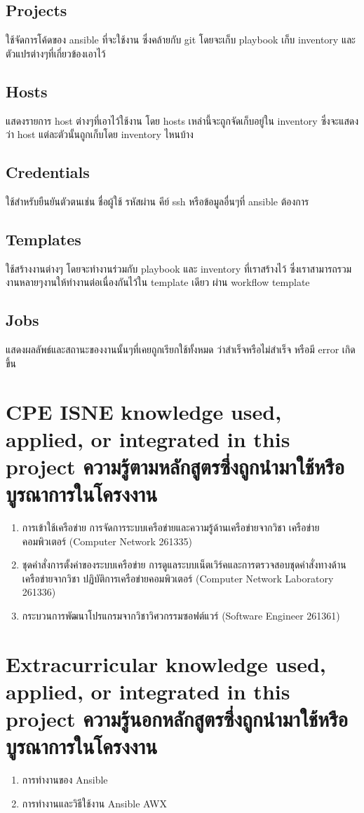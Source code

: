 \subsection{Projects}
\hspace{0.5in} ใช้จัดการโค้ดของ ansible ที่จะใช้งาน ซึ่งคล้ายกับ git โดยจะเก็บ playbook เก็บ inventory และตัวแปรต่างๆที่เกี่ยวข้องเอาไว้

\subsection{Hosts}
\hspace{0.5in} แสดงรายการ host ต่างๆที่เอาไว้ใช้งาน โดย hosts เหล่านี้จะถูกจัดเก็บอยู่ใน inventory ซึ่งจะแสดงว่า host แต่ละตัวนั้นถูกเก็บโดย inventory ไหนบ้าง

\subsection{Credentials}
\hspace{0.5in} ใช้สำหรับยืนยันตัวตนเช่น ชื่อผู้ใช้ รหัสผ่าน คีย์ ssh หรือข้อมูลอื่นๆที่ ansible ต้องการ

\subsection{Templates}
\hspace{0.5in} ใช้สร้างงานต่างๆ โดยจะทำงานร่วมกับ playbook และ inventory ที่เราสร้างไว้ ซึ่งเราสามารถรวม งานหลายๆงานให้ทำงานต่อเนื่องกันไว้ใน template เดียว ผ่าน workflow template

\subsection{Jobs}
\hspace{0.5in} แสดงผลลัพธ์และสถานะของงานนั้นๆที่เคยถูกเรียกใช้ทั้งหมด ว่าสำเร็จหรือไม่สำเร็จ หรือมี error เกิดขึ้น

\section{\ifenglish%
\ifcpe CPE \else ISNE \fi knowledge used, applied, or integrated in this project
\else%
ความรู้ตามหลักสูตรซึ่งถูกนำมาใช้หรือบูรณาการในโครงงาน
\fi
}
\begin{enumerate}
\item การเข้าใช้เครือข่าย การจัดการระบบเครือข่ายและความรู้ด้านเครือข่ายจากวิชา เครือข่ายคอมพิวเตอร์ (Computer Network 261335) 
\item ชุดคำสั่งการตั้งค่าของระบบเครือข่าย การดูแลระบบเน็ตเวิร์คและการตรวจสอบชุดคำสั่งทางด้านเครือข่ายจากวิชา ปฏิบัติการเครือข่ายคอมพิวเตอร์ (Computer Network Laboratory 261336)
\item กระบวนการพัฒนาโปรแกรมจากวิชาวิศวกรรมซอฟต์แวร์ (Software Engineer 261361)
\end{enumerate}

\section{\ifenglish%
Extracurricular knowledge used, applied, or integrated in this project
\else%
ความรู้นอกหลักสูตรซึ่งถูกนำมาใช้หรือบูรณาการในโครงงาน
\fi
}

\begin{enumerate}
  \item การทำงานของ Ansible
  \item การทำงานและวิธีใช้งาน Ansible AWX
\end{enumerate}
